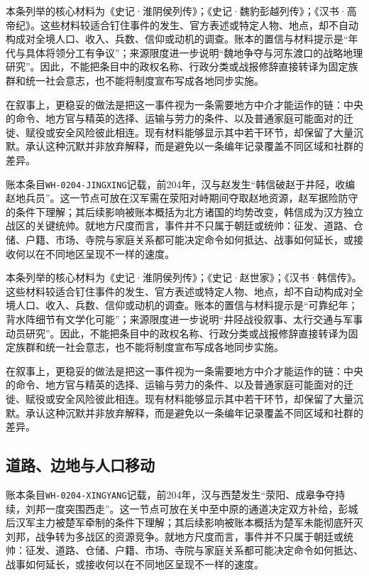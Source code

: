 本条列举的核心材料为《史记·淮阴侯列传》；《史记·魏豹彭越列传》；《汉书·高帝纪》。这些材料较适合钉住事件的发生、官方表述或特定人物、地点，却不自动构成对全境人口、收入、兵数、信仰或动机的调查。账本的置信与材料提示是“年代与具体将领分工有争议”；来源限度进一步说明“魏地争夺与河东渡口的战略地理研究”。因此，不能把条目中的政权名称、行政分类或战报修辞直接转译为固定族群和统一社会意志，也不能将制度宣布写成各地同步实施。

在叙事上，更稳妥的做法是把这一事件视为一条需要地方中介才能运作的链：中央的命令、地方官与精英的选择、运输与劳力的条件、以及普通家庭可能面对的迁徙、赋役或安全风险彼此相连。现有材料能够显示其中若干环节，却保留了大量沉默。承认这种沉默并非放弃解释，而是避免以一条编年记录覆盖不同区域和社群的差异。

账本条目\texttt{WH-0204-JINGXING}记载，前204年，汉与赵发生“韩信破赵于井陉，收编赵地兵员”。这一节点可放在汉军需在荥阳对峙期间夺取赵地资源，赵军据险防守的条件下理解；其后续影响被账本概括为北方诸国的均势改变，韩信成为汉方独立战区的关键统帅。就地方尺度而言，事件并不只属于朝廷或统帅：征发、道路、仓储、户籍、市场、寺院与家庭关系都可能决定命令如何抵达、战事如何延长，或接收何以在不同地区呈现不一样的速度。

本条列举的核心材料为《史记·淮阴侯列传》；《史记·赵世家》；《汉书·韩信传》。这些材料较适合钉住事件的发生、官方表述或特定人物、地点，却不自动构成对全境人口、收入、兵数、信仰或动机的调查。账本的置信与材料提示是“可靠纪年；背水阵细节有文学化可能”；来源限度进一步说明“井陉战役叙事、太行交通与军事动员研究”。因此，不能把条目中的政权名称、行政分类或战报修辞直接转译为固定族群和统一社会意志，也不能将制度宣布写成各地同步实施。

在叙事上，更稳妥的做法是把这一事件视为一条需要地方中介才能运作的链：中央的命令、地方官与精英的选择、运输与劳力的条件、以及普通家庭可能面对的迁徙、赋役或安全风险彼此相连。现有材料能够显示其中若干环节，却保留了大量沉默。承认这种沉默并非放弃解释，而是避免以一条编年记录覆盖不同区域和社群的差异。

\subsection{道路、边地与人口移动}

账本条目\texttt{WH-0204-XINGYANG}记载，前204年，汉与西楚发生“荥阳、成皋争夺持续，刘邦一度突围西走”。这一节点可放在关中至中原的通道决定双方补给，彭城后汉军主力被楚军牵制的条件下理解；其后续影响被账本概括为楚军未能彻底歼灭刘邦，战争转为多战区的资源竞争。就地方尺度而言，事件并不只属于朝廷或统帅：征发、道路、仓储、户籍、市场、寺院与家庭关系都可能决定命令如何抵达、战事如何延长，或接收何以在不同地区呈现不一样的速度。

